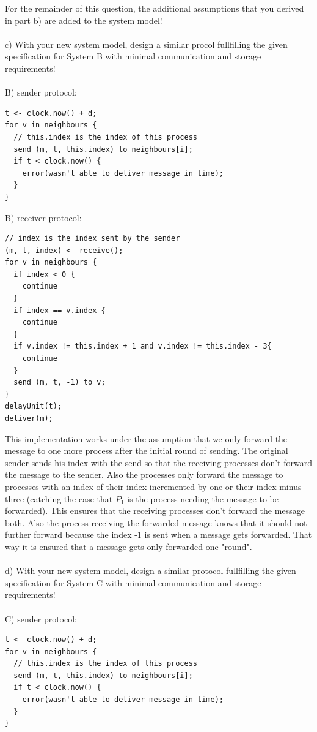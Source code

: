 \documentclass{article}
\begin{document}
For the remainder of this question, the additional assumptions that you derived in part b) are added to
the system model!\\
\\
c) With your new system model, design a similar procol fullfilling the given specification for System B
with minimal communication and storage requirements!\\
\\
B) sender protocol:
\begin{lstlisting}[style=CStyle]
t <- clock.now() + d;
for v in neighbours {
  // this.index is the index of this process
  send (m, t, this.index) to neighbours[i];
  if t < clock.now() {
    error(wasn't able to deliver message in time);
  }
}
\end{lstlisting}
B) receiver protocol:
\begin{lstlisting}[style=CStyle]
// index is the index sent by the sender
(m, t, index) <- receive();
for v in neighbours {
  if index < 0 {
    continue
  }
  if index == v.index {
    continue
  }
  if v.index != this.index + 1 and v.index != this.index - 3{
    continue
  }
  send (m, t, -1) to v;
}
delayUnit(t);
deliver(m);
\end{lstlisting}
This implementation works under the assumption that we only forward the message to one more process after
the initial round of sending. The original sender sends his index with the send so that the receiving
processes don't forward the message to the sender. Also the processes only forward the message to 
processes with an index of their index incremented by one or their index minus three (catching the case
that $P_1$ is the process needing the message to be forwarded). This ensures that the receiving processes 
don't forward the message both. Also the process receiving the forwarded message knows that it should not
further forward because the index -1 is sent when a message gets forwarded. That way it is ensured that
a message gets only forwarded one "round".\\
\\
d) With your new system model, design a similar protocol fullfilling the given specification for System
C with minimal communication and storage requirements!\\
\\
C) sender protocol:
\begin{lstlisting}[style=CStyle]
t <- clock.now() + d;
for v in neighbours {
  // this.index is the index of this process
  send (m, t, this.index) to neighbours[i];
  if t < clock.now() {
    error(wasn't able to deliver message in time);
  }
}
\end{lstlisting}
\end{document}
